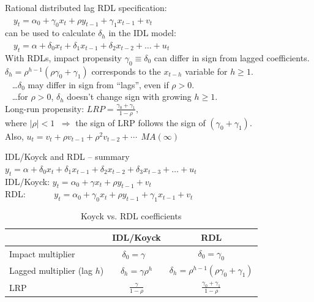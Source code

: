 \documentclass{beamer}
\begin{document}
\begin{frame}{Rational distributed lag}
RDL specification:\\
\medskip
$\quad y_t = \alpha_0+\gamma_0 x_t + \rho y_{t-1} +\gamma_1 x_{t-1} + v_t $\\
\medskip
can be used to calculate $\delta_h$ in the IDL model:\\
\medskip
$\quad y_t = \alpha + \delta_0 x_t  + \delta_1 x_{t-1} + \delta_2 x_{t-2} + \dots + u_t $\\
\medskip
With RDLs, impact propensity $\gamma_0 \equiv \delta_0$ can differ in sign from lagged coefficients. \\
\medskip
$\delta_h = \rho^{h-1}(\rho \gamma_0 + \gamma_1)$ corresponds to the $x_{t-h}$ variable for $h \geq 1$. \\
\smallskip
~ \dots $\delta_0$ may differ in sign from ``lags'', even if $\rho > 0$.\\
~ \dots for $\rho > 0$, $\delta_h$ doesn't change sign with growing $h \geq 1$. \\
\bigskip
Long-run propensity: $\textit{LRP} = \frac{\gamma_0 + \gamma_1}{1-\rho},$\\
\smallskip
where $|\rho| < 1$ $\> \Rightarrow$ the sign of LRP follows the sign of $(\gamma_0+\gamma_1)$. \\
\medskip
Also,  $u_t = v_t + \rho v_{t-1} + \rho^2 v_{t-2} + \cdots \> \>  MA(\infty)$
\end{frame}
\begin{frame}{IDL/Koyck and RDL -- summary}
$y_t = \alpha + \delta_0 x_t  + \delta_1 x_{t-1} + \delta_2 x_{t-2} + \delta_3 x_{t-3}+ \dots + u_t $\\
\bigskip
IDL/Koyck: $y_t = \alpha_0 + \gamma x_t + \rho y_{t-1} + v_t$\\
\smallskip
RDL: $\qquad \quad y_t = \alpha_0+\gamma_0 x_t + \rho y_{t-1} +\gamma_1 x_{t-1} + v_t $\\
\bigskip
\begin{table}
\centering
\caption{Koyck vs. RDL coefficients}
\label{Tab1}
\begin{tabular}{|l|c|c|}
\hline
  & IDL/Koyck & RDL \\
  \hline 
Impact multiplier & $\delta_0=\gamma~~~$ & $\delta_0=\gamma_0$ \\
\hline
Lagged multiplier (lag $h$) & $\delta_h = \gamma \rho^h$ & $\delta_h = \rho^{h-1}(\rho \gamma_0 + \gamma_1)$ \\
\hline 
LRP & $\frac{\gamma}{1-\rho}$ & $\frac{\gamma_0 + \gamma_1}{1-\rho}$\\
\hline
\end{tabular}
\end{table} 

\end{frame}
\end{document}
